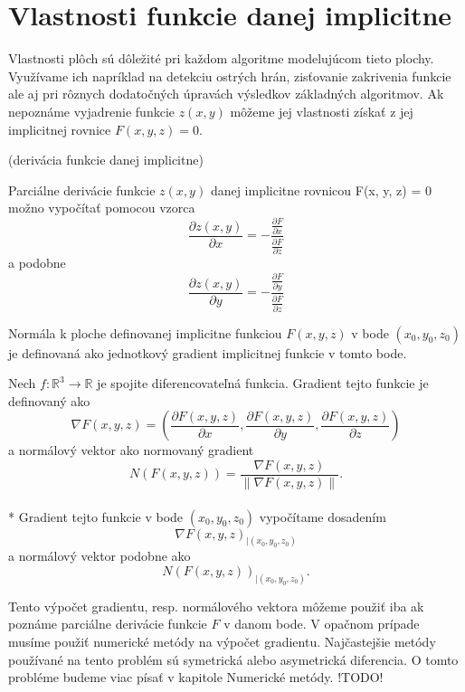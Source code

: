 \newpage

\section{Vlastnosti funkcie danej implicitne}

Vlastnosti plôch sú dôležité pri každom algoritme modelujúcom tieto plochy. Využívame ich napríklad na detekciu ostrých hrán, 
zisťovanie zakrivenia funkcie ale aj pri rôznych dodatočných úpravách výsledkov základných algoritmov.
Ak nepoznáme vyjadrenie funkcie $z(x, y)$ môžeme jej vlastnosti získať z jej implicitnej rovnice $F(x, y, z) = 0$.


\begin{theorem}
    (derivácia funkcie danej implicitne)

    Parciálne derivácie funkcie $z(x, y)$ danej implicitne rovnicou F(x, y, z) = 0 možno vypočítať pomocou vzorca
    $$\frac{\partial z(x, y)}{\partial x} = -\frac{\frac{\partial F}{\partial x}}{\frac{\partial F}{\partial z}}$$
    a podobne 
    $$\frac{\partial z(x, y)}{\partial y} = -\frac{\frac{\partial F}{\partial y}}{\frac{\partial F}{\partial z}}$$
\end{theorem}

Normála k ploche definovanej implicitne funkciou $F(x,y,z)$ v bode $(x_0, y_0, z_0)$ je definovaná ako jednotkový 
gradient implicitnej funkcie  v tomto bode.

\begin{definition}
    Nech $f : \mathbb{R}^3 \to \mathbb{R}$ je spojite diferencovateľná funkcia. Gradient tejto 
    funkcie je definovaný ako 
    $$\nabla F(x, y, z) = (\frac{\partial F(x, y, z)}{\partial x}, \frac{\partial F(x, y, z)}{\partial y}, 
    \frac{\partial F(x, y, z)}{\partial z})$$
    a normálový vektor ako normovaný gradient
    $$N(F(x, y, z))  = \frac{\nabla F(x, y, z)}{\| \nabla F(x, y, z) \|}.$$
    \\*
    Gradient tejto funkcie v bode $(x_0, y_0, z_0)$ vypočítame dosadením $$\nabla F(x, y, z)_{\big|(x_0, y_0, z_0)}$$ 
    a normálový vektor podobne ako $$N(F(x, y, z))_{\big|(x_0, y_0, z_0)}.$$
\end{definition}

Tento výpočet gradientu, resp. normálového vektora môžeme použiť iba ak poznáme parciálne derivácie funkcie $F$ v danom bode.
V opačnom prípade musíme použiť numerické metódy na výpočet gradientu. Najčastejšie metódy používané na tento problém sú 
symetrická alebo asymetrická diferencia. O tomto probléme budeme viac písať v kapitole Numerické metódy. !TODO! 

